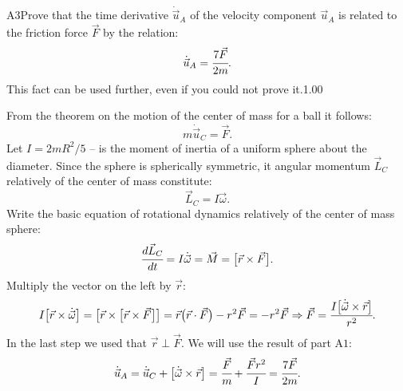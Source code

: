 \documentclass[11pt,a4paper]{article}
\begin{document}
\begin{solcard}{A3}{Prove that the time derivative $\dot{\vec{u}}_A$ of the velocity component $\vec{u}_A$ is related to the friction force $\vec{F}$ by the relation: $$\dot{\vec{u}}_A=\cfrac{7\vec{F}}{2m}{.} $$This fact can be used further, even if you could not prove it.}{1.00}

From the theorem on the motion of the center of mass for a ball it follows: $$m\dot{\vec{u}}_C=\vec{F}{.} $$Let $I=2mR^2/5$ – is the moment of inertia of a uniform sphere about the diameter. Since the sphere is spherically symmetric, it angular momentum $\vec{L}_C$ relatively of the center of mass constitute: $$\vec{L}_C=I\vec{\omega}{.} $$Write the basic equation of rotational dynamics relatively of the center of mass sphere: $$\cfrac{d\vec{L}_C}{dt}=I\dot{\vec{\omega}}=\vec{M}=\bigl[\vec{r}\times\vec{F}\bigr]{.} $$Multiply the vector on the left by $\vec{r}$: $$I\bigl[\vec{r}\times\dot{\vec{\omega}}\bigr]=\bigl[\vec{r}\times\bigl[\vec{r}\times\vec{F}\bigr]\bigr]=\vec{r}\bigl(\vec{r}\cdot\vec{F}\bigr)-r^2\vec{F}=-r^2\vec{F}\Rightarrow \vec{F}=\cfrac{I\bigl[\dot{\vec{\omega}}\times\vec{r}\bigr]}{r^2}{.} $$In the last step we used that $\vec{r}\perp\vec{F}$. We will use the result of part $\mathrm{A1}$: $$\dot{\vec{u}}_A=\dot{\vec{u}}_C+\bigl[\dot{\vec{\omega}}\times\vec{r}\bigr]=\cfrac{\vec{F}}{m}+\cfrac{\vec{F}r^2}{I}=\cfrac{7\vec{F}}{2m}{.} $$

\end{solcard}
\end{document}
